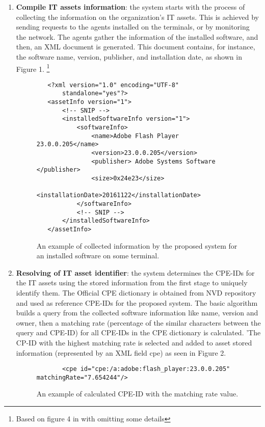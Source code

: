 \documentclass{llncs}
\begin{document}
\begin{enumerate}
 \item \textbf{Compile IT assets information}: the system starts with the process of collecting the information on the organization's IT assets. This is achieved by sending requests to the agents installed on the terminals, or by monitoring the network. The agents gather the information of the installed software, and then, an XML document is generated. This document contains, for instance, the software name, version, publisher, and installation date, as shown in Figure 1.  \footnote{Based on figure 4 in \cite{paper1} with omitting some details} 

 \begin{figure}
 \centering
   \lstset{language=XML}
    \begin{lstlisting}
   <?xml version="1.0" encoding="UTF-8"
       standalone="yes"?>
   <assetInfo version="1">
       <!-- SNIP -->
       <installedSoftwareInfo version="1">
           <softwareInfo>
               <name>Adobe Flash Player 23.0.0.205</name>
               <version>23.0.0.205</version>
               <publisher> Adobe Systems Software </publisher>
               <size>0x24e23</size>
               <installationDate>20161122</installationDate>
           </softwareInfo>
           <!-- SNIP -->
       </installedSoftwareInfo>
   </assetInfo>
    \end{lstlisting}
   \caption{An example of collected information by the proposed system for an installed software on some terminal.}
    \end{figure}
   
   
   \item \textbf{Resolving of IT asset identifier}: the system determines the CPE-IDs for the IT assets using the stored information from the first stage to uniquely identify them. The Official CPE dictionary is obtained from NVD repository and used as reference CPE-IDs for the proposed system. The basic algorithm builds a query from the collected software information like name, version and owner, then a matching rate (percentage of the similar characters between the query and CPE-ID) for all CPE-IDs in the CPE dictionary is calculated. '\newpage The CP-ID with the highest matching rate is selected and added to asset stored information (represented by an XML field cpe) as seen in Figure 2.
   
    \begin{figure}
    \centering
      \lstset{language=XML}
       \begin{lstlisting} 
       <cpe id="cpe:/a:adobe:flash_player:23.0.0.205" matchingRate="7.654244"/>
       \end{lstlisting}
      \caption{An example of calculated CPE-ID with the matching rate value.}
       \end{figure}
      

\end{enumerate}
\end{document}
